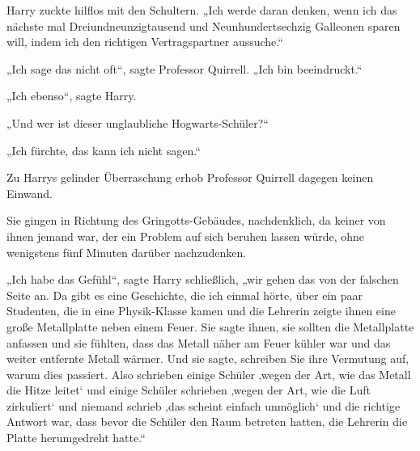 Harry zuckte hilflos mit den Schultern. „Ich werde daran denken, wenn ich das nächste mal Dreiundneunzigtausend und Neunhundertsechzig Galleonen sparen will, indem ich den richtigen Vertragspartner aussuche.“

„Ich sage das nicht oft“, sagte Professor Quirrell. „Ich bin beeindruckt.“

„Ich ebenso“, sagte Harry.

„Und wer ist dieser unglaubliche Hogwarts-Schüler?“

„Ich fürchte, das kann ich nicht sagen.“

Zu Harrys gelinder Überraschung erhob Professor Quirrell dagegen keinen Einwand.

Sie gingen in Richtung des Gringotts-Gebäudes, nachdenklich, da keiner von ihnen jemand war, der ein Problem auf sich beruhen lassen würde, ohne wenigstens fünf Minuten darüber nachzudenken.

„Ich habe das Gefühl“, sagte Harry schließlich, „wir gehen das von der falschen Seite an. Da gibt es eine Geschichte, die ich einmal hörte, über ein paar Studenten, die in eine Physik-Klasse kamen und die Lehrerin zeigte ihnen eine große Metallplatte neben einem Feuer. Sie sagte ihnen, sie sollten die Metallplatte anfassen und sie fühlten, dass das Metall näher am Feuer kühler war und das weiter entfernte Metall wärmer. Und sie sagte, schreiben Sie ihre Vermutung auf, warum dies passiert. Also schrieben einige Schüler ‚wegen der Art, wie das Metall die Hitze leitet‘ und einige Schüler schrieben ‚wegen der Art, wie die Luft zirkuliert‘ und niemand schrieb ‚das scheint einfach unmöglich‘ und die richtige Antwort war, dass bevor die Schüler den Raum betreten hatten, die Lehrerin die Platte herumgedreht hatte.“

